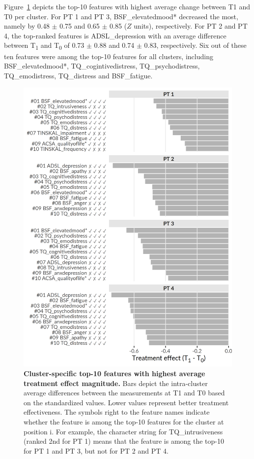 \documentclass[
  oneside]{book}
\begin{document}
Figure~\ref{fig:06-treatment-effects} depicts the top-10 features with highest average change between T1 and T0 per cluster.
For PT 1 and PT 3, BSF\_elevatedmood* decreased the most, namely by 0.48 \(\pm\) 0.75 and 0.65 \(\pm\) 0.85 (\(Z\) units), respectively.
For PT 2 and PT 4, the top-ranked features is ADSL\_depression with an average difference between T\textsubscript{1} and T\textsubscript{0} of 0.73 \(\pm\) 0.88 and 0.74 \(\pm\) 0.83, respectively.
Six out of these ten features were among the top-10 features for all clusters, including BSF\_elevatedmood*, TQ\_cogintivedistress, TQ\_psychodistress, TQ\_emodistress, TQ\_distress and BSF\_fatigue.



\begin{figure}[htbp]

{\centering \includegraphics[width=0.643\linewidth]{figures/06-treatment-effects} 

}

\caption{\textbf{Cluster-specific top-10 features with highest average treatment effect magnitude.} Bars depict the intra-cluster average differences between the measurements at T1 and T0 based on the standardized values. Lower values represent better treatment effectiveness. The symbols right to the feature names indicate whether the feature is among the top-10 features for the cluster at position i. For example, the character string     for TQ\_intrusiveness (ranked 2nd for PT 1) means that the feature is among the top-10 for PT 1 and PT 3, but not for PT 2 and PT 4.}\label{fig:06-treatment-effects}
\end{figure}
\end{document}

